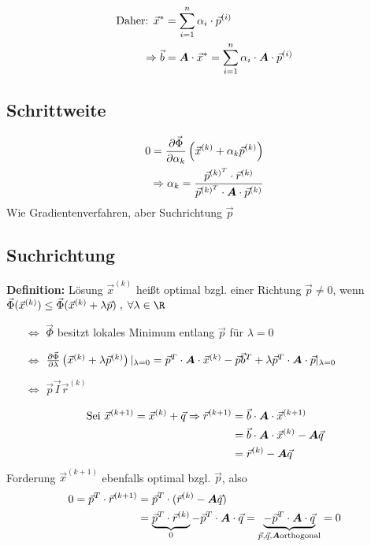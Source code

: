 \begin{align}
\text{Daher: } \vec{x}^* &= \sum^n_{i=1} \alpha_i \cdot \vec{p}^{(i)}\\
\Rightarrow \vec{b} &= \boldsymbol {A} \cdot \vec{x}^* = \sum^n_{i=1} \alpha_i \cdot \boldsymbol {A} \cdot \vec{p}^{(i)}
\end{align}

\subsection{Schrittweite}
\begin{align}
0 = \frac{\partial\vec{\Phi}}{\partial\alpha_k}\left(\vec{x}^{(k)}+\alpha_k\vec{p}^{(k)}\right)\\
\Rightarrow\alpha_k = \frac{\vec{p}^{{(k)}^T}\cdot\vec{r}^{(k)}}{\vec{p}^{{(k)}^T}\cdot\boldsymbol {A}\cdot\vec{p}^{(k)}}
\end{align}
Wie Gradientenverfahren, aber Suchrichtung $\vec{p}$

\subsection{Suchrichtung}
\textbf{Definition:} Lösung $\vec{x}^{(k)}$ heißt optimal bzgl. einer Richtung $\vec{p}\neq 0$, wenn $\vec{\Phi}(\vec{x}^{(k)})\leq\vec{\Phi}(\vec{x}^{(k)}+\lambda\vec{p})\;,\;\forall\lambda\in\R$\\
\begin{itemize}
\item[$\Leftrightarrow$] $\vec{\Phi}$ besitzt lokales Minimum entlang $\vec{p}$ für $\lambda = 0$
\item[$\Leftrightarrow$] $\frac{\partial\vec{\Phi}}{\partial\lambda}\left(\vec{x}^{(k)}+\lambda\vec{p}^{(k)}\right)\vert_{\lambda = 0} = \vec{p}^T\cdot\boldsymbol {A}\cdot\vec{x}^{(k)} - \vec{p}\vec{b}^T + \lambda\vec{p}^T\cdot\boldsymbol {A}\cdot\vec{p}\vert_{\lambda = 0}$
\item[$\Leftrightarrow$] $\vec{p}\vec{I}\vec{r}^{(k)}$
\end{itemize}
\begin{align}
\text{Sei }\vec{x}^{(k+1)} = \vec{x}^{(k)} + \vec{q}\Rightarrow\vec{r}^{(k+1)} &= \vec{b}\cdot\boldsymbol {A}\cdot\vec{x}^{(k+1)}\\
&= \vec{b}\cdot\boldsymbol {A}\cdot\vec{x}^{(k)} - \boldsymbol {A}\vec{q}\\
&= \vec{r}^{(k)} - \boldsymbol {A}\vec{q}
\end{align}
Forderung $\vec{x}^{(k+1)}$ ebenfalls optimal bzgl. $\vec{p}$, also
\begin{align}
0 = \vec{p}^T\cdot\vec{r}^{(k+1)} &= \vec{p}^T\cdot(\vec{r}^{(k)} - \boldsymbol {A}\vec{q})\\
&= \underbrace{\vec{p}^T\cdot\vec{r}^{(k)}}_{0}-\vec{p}^T\cdot\boldsymbol {A}\cdot\vec{q} = \underbrace{-\vec{p}^T\cdot\boldsymbol {A}\cdot\vec{q}}_{\vec{p},\vec{q},\boldsymbol {A}\text{orthogonal}} = 0
\end{align}

